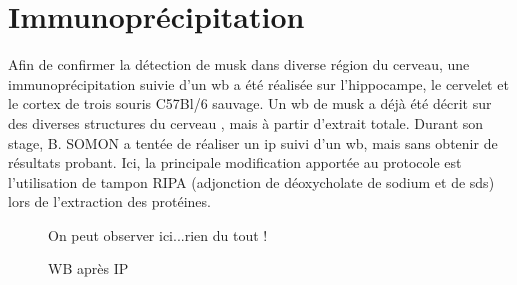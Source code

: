 \section{Immunoprécipitation}
\label{sec:IPresultat}
Afin de confirmer la détection de \gls{musk} dans diverse région du cerveau, une immunoprécipitation suivie d'un \gls{wb} a été réalisée sur l'hippocampe, le cervelet et le cortex de trois souris C57Bl/6 sauvage. Un \gls{wb} de \gls{musk} a déjà été décrit sur des diverses structures du cerveau \cite{Garcia-Osta2006}, mais à partir d'extrait totale. Durant son stage, B. SOMON a tentée de réaliser un \gls{ip} suivi d'un \gls{wb}, mais sans obtenir de résultats probant. Ici, la principale modification apportée au protocole est l'utilisation de tampon RIPA (adjonction de déoxycholate de sodium et de \acrshort{sds}) lors de l'extraction des protéines.

\begin{figure}[h]
	\caption{WB après IP}{On peut observer ici...rien du tout !}
	\label{fig:WBMuSK}
\end{figure}